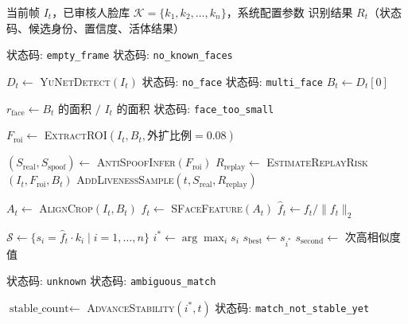 \documentclass[UTF8]{heuthesis}
\begin{document}
\begin{algorithm}[htbp]
\caption{终端帧级识别管线}
\begin{algorithmic}[1]
\restoreAlgoEnglish
\Require 当前帧 $I_t$，已审核人脸库 $\mathcal{K} = \{k_1, k_2, \ldots, k_n\}$，系统配置参数
\Ensure 识别结果 $R_t$（状态码、候选身份、置信度、活体结果）

    \State \Return 状态码: \texttt{empty\_frame}
\endIf
{}
    \State \Return 状态码: \texttt{no\_known\_faces}
\endIf

\Statex
{}
\State $D_t \gets$ \textsc{YuNetDetect}$(I_t)$ 
    \State \Return 状态码: \texttt{no\_face}
    \State \Return 状态码: \texttt{multi\_face}
\endIf
\State $B_t \gets D_t[0]$

\Statex
{}
\State $r_{\mathrm{face}} \gets B_t$ 的面积 $/$ $I_t$ 的面积
    \State \Return 状态码: \texttt{face\_too\_small}
\endIf

\Statex
{}
\State $F_{\mathrm{roi}} \gets$ \textsc{ExtractROI}$(I_t, B_t, \text{外扩比例} = 0.08)$

\Statex
{}
\State $(S_{\mathrm{real}}, S_{\mathrm{spoof}}) \gets$ \textsc{AntiSpoofInfer}$(F_{\mathrm{roi}})$ 
\State $R_{\mathrm{replay}} \gets$ \textsc{EstimateReplayRisk}$(I_t, F_{\mathrm{roi}}, B_t)$ 
\State \textsc{AddLivenessSample}$(t, S_{\mathrm{real}}, R_{\mathrm{replay}})$ 

\Statex
{}
\State $A_t \gets$ \textsc{AlignCrop}$(I_t, B_t)$ 
\State $f_t \gets$ \textsc{SFaceFeature}$(A_t)$
\State $\hat{f}_t \gets f_t / \|f_t\|_2$

\Statex
{}
\State $\mathcal{S} \gets \{s_i = \hat{f}_t \cdot k_i \mid i = 1,\ldots,n\}$ 
\State $i^* \gets \arg\max_i s_i$
\State $s_{\mathrm{best}} \gets s_{i^*}$
\State $s_{\mathrm{second}} \gets$ 次高相似度值

    \State \Return 状态码: \texttt{unknown}
\endIf
{}
    \State \Return 状态码: \texttt{ambiguous\_match}
\endIf

\Statex
{}
\State $\text{stable\_count} \gets$ \textsc{AdvanceStability}$(i^*, t)$
    \State \Return 状态码: \texttt{match\_not\_stable\_yet}
\endIf


\end{algorithmic}
\end{algorithm}
\end{document}
